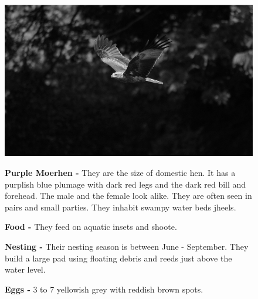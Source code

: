 \begin{figure}[H]
\begin{center}
\includegraphics{figure/Land_birds/01_pariah_kite/pariah-kite.eps}
\end{center}
\medskip
\noindent
{\bf Purple Moerhen -} They are the size of domestic hen. It has a purplish blue plumage with dark red legs and the dark red bill and forehead. The male and the female look alike. They are often seen in pairs and small parties. They inhabit swampy water beds jheels.

\medskip
{\bf Food -} They feed on aquatic insets and shoote. 

{\bf Nesting -} Their nesting season is between June - September. They build a large pad using floating debris and reeds just above the water level. 

{\bf Eggs -} 3 to 7 yellowish grey with reddish brown spots.
\end{figure}

\vfill\eject

~\phantom{a}
\vfill


